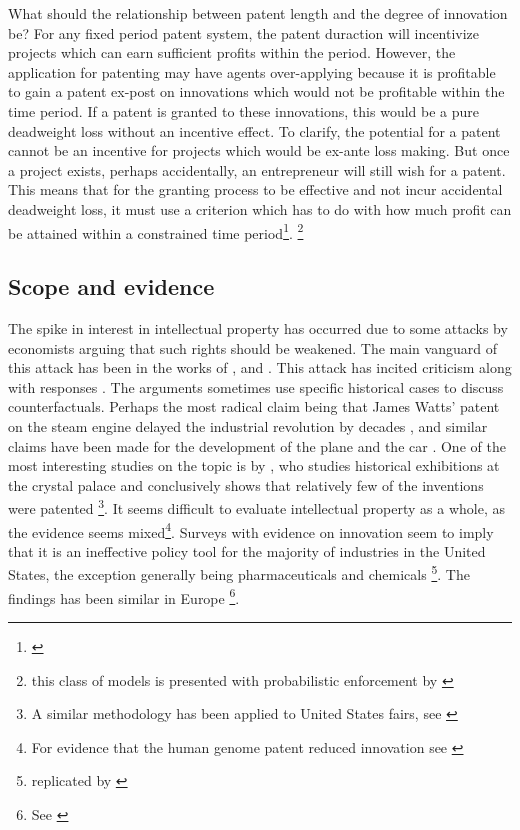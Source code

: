 What should the relationship between patent length and the degree of innovation be? For any fixed period patent system, the patent duraction will incentivize projects which can earn sufficient profits within the period. However, the application for patenting may have agents over-applying because it is profitable to gain a patent ex-post on innovations which would not be profitable within the time period. If a patent is granted to these innovations, this would be a pure deadweight loss without an incentive effect. To clarify, the potential for a patent cannot be an incentive for projects which would be ex-ante loss making. But once a project exists, perhaps accidentally, an entrepreneur will still wish for a patent. This means that for the granting process to be effective and not incur accidental deadweight loss, it must use a criterion which has to do with how much profit can be attained within a constrained time period\footnote{\cite{ODonoghue1998}}. \footnote{this class of models is presented with probabilistic enforcement by \cite{Chou2007} }

\subsection{Scope and evidence}

The spike in interest in intellectual property has occurred due to some attacks by economists arguing that such rights should be weakened. The main vanguard of this attack has been in the works of \cite{dosi2006much}, \cite{boldrinlevine} and  \cite{bessen2008patent}. This attack has incited criticism \citep{scherer2009michele} along with responses \citep{boldrin2013s}. The arguments sometimes use specific historical cases to discuss counterfactuals. Perhaps the most radical claim being that James Watts' patent on the steam engine delayed the industrial revolution by decades \citep{boldrinlevine} \citep{nuvolari2004collective}, and similar claims have been made for the development of the plane and the car \citep{merges1994limiting}. One of the most interesting studies on the topic is by \cite{moser2005patent}, who studies historical exhibitions at the crystal palace and conclusively shows that relatively few of the inventions were patented \citep{moser2005patent}\footnote{A similar methodology has been applied to United States fairs, see \cite{khan2013going}}. It seems difficult to evaluate intellectual property as a whole, as the evidence seems mixed\footnote{For evidence that the human genome patent reduced innovation see \cite{williams2013intellectual}}. Surveys with evidence on innovation seem to imply that it is an ineffective policy tool for the majority of industries in the United States, the exception generally being pharmaceuticals and chemicals \footnote{\citep{mansfield1986patents} \citep{levin1987appropriating} replicated by \citep{cohen2000protecting}}. The findings has been similar in Europe \footnote{See \citep{arundel1998percentage}}. 

